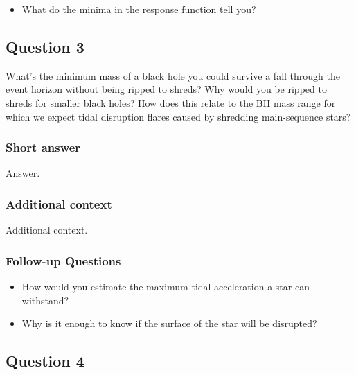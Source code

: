 \documentclass[a4paper,10pt]{article}
\begin{document}
\begin{itemize}
    \item What do the minima in the response function tell you?
\end{itemize}


\newpage
\subsection{Question 3}

What's the minimum mass of a black hole you could survive a fall through the event horizon without being ripped to shreds? Why would you be ripped to shreds for smaller black holes? How does this relate to the BH mass range for which we expect tidal disruption flares caused by shredding main-sequence stars?

\subsubsection{Short answer}

Answer.

\subsubsection{Additional context}

Additional context.

\subsubsection{Follow-up Questions}

\begin{itemize}
    \item How would you estimate the maximum tidal acceleration a star can withstand?
    \item Why is it enough to know if the surface of the star will be disrupted?
\end{itemize}


\newpage
\subsection{Question 4}
\end{document}

